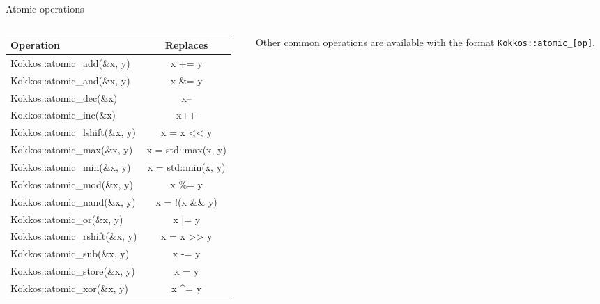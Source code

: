\documentclass[
    aspectratio=169,
    handout,
]{beamer}
\begin{document}
\begin{frame}[fragile]{Atomic operations}
  \begin{columns}
    \begin{column}{0.55\linewidth}
    \begin{tabular}{|l|c|}
      \hline
      Operation & Replaces \\
      \hline
      Kokkos::atomic\_add(\&x, y)    & x += y \\
      Kokkos::atomic\_and(\&x, y)    & x \&= y \\
      Kokkos::atomic\_dec(\&x)       & x-- \\
      Kokkos::atomic\_inc(\&x)       & x++ \\
      Kokkos::atomic\_lshift(\&x, y) & x = x << y \\
      Kokkos::atomic\_max(\&x, y)    & x = std::max(x, y) \\
      Kokkos::atomic\_min(\&x, y)    & x = std::min(x, y) \\
      Kokkos::atomic\_mod(\&x, y)    & x \%= y \\
      Kokkos::atomic\_nand(\&x, y)   & x = !(x \&\& y) \\
      Kokkos::atomic\_or(\&x, y)     & x |= y \\
      Kokkos::atomic\_rshift(\&x, y) & x = x >> y \\
      Kokkos::atomic\_sub(\&x, y)    & x -= y \\
      Kokkos::atomic\_store(\&x, y)  & x = y \\
      Kokkos::atomic\_xor(\&x, y)    & x \^{}= y \\
      \hline
    \end{tabular}
    \end{column}

      \begin{column}{0.35\linewidth}
        Other common operations are available with the format \texttt{Kokkos::atomic\_[op]}.
    \end{column}
  \end{columns}
\end{frame}
\end{document}
